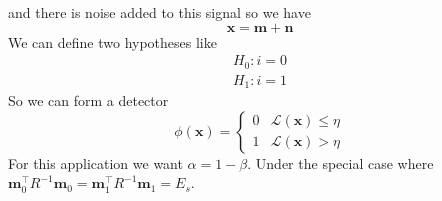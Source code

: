 \documentclass[a4paper]{article}
\begin{document}
and there is noise added to this signal so we have
\[
  \bm{x} = \bm{m} + \bm{n}
\]
We can define two hypotheses like
\[
  \begin{aligned}
    H_0: i = 0 \\
    H_1: i = 1
  \end{aligned}
\]
So we can form a detector
\[
  \phi(\bm{x}) = 
  \begin{cases}
    0 & \mathcal{L}(\bm{x}) \leq \eta \\
    1 & \mathcal{L}(\bm{x}) > \eta
    
  \end{cases}
\]
For this application we want $\alpha = 1 - \beta$. Under the special case where $\bm{m}_0^\top R^{-1} \bm{m}_0 = \bm{m}_1^\top R^{-1} \bm{m}_1 = E_s$.
\end{document}
